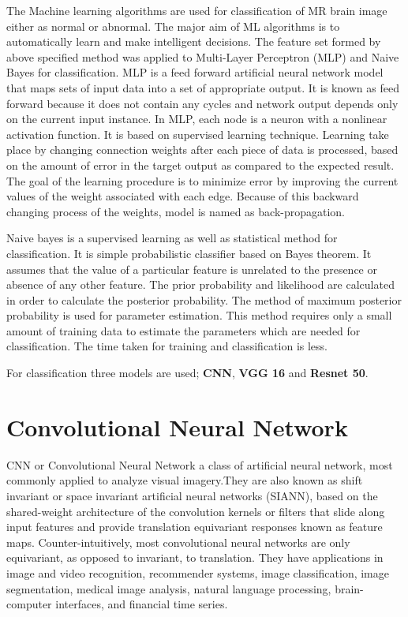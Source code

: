\documentclass[10pt]{report}
\begin{document}
	The Machine learning algorithms are used for
	classification of MR brain image either as normal or abnormal.  The major
	aim of ML algorithms is to automatically learn and make intelligent
	decisions. The feature set formed by above specified method was applied to
	Multi-Layer Perceptron (MLP) and Naive Bayes for classification.  MLP is
	a feed forward artificial neural network model that maps sets of input data
	into a set of appropriate output. It is known as feed forward because it
	does not contain any cycles and network output depends only on the current
	input instance. In MLP, each node is a neuron with a nonlinear activation
	function. It is based on supervised learning technique. Learning take place
	by changing connection weights after each piece of data is processed, based
	on the amount of error in the target output as compared to the expected
	result. The goal of the learning procedure is to minimize error by improving
	the current values of the weight associated with each edge. Because of this
	backward changing process of the weights, model is named as
	back-propagation.

	Naive bayes is a supervised learning as well as statistical method for
	classification. It is simple probabilistic classifier based on Bayes
	theorem. It assumes that the value of a particular feature is unrelated to
	the presence or absence of any other feature. The prior probability and
	likelihood are calculated in order to calculate the posterior probability.
	The method of maximum posterior probability is used for parameter
	estimation. This method requires only a small amount of training data to
	estimate the parameters which are needed for classification. The time taken
	for training and classification is less.

	For classification three models are used; \textbf{CNN}, \textbf{VGG 16} and
	\textbf{Resnet 50}.

	\section{Convolutional Neural Network}%

	CNN or Convolutional Neural Network a class of artificial neural network,
	most commonly applied to analyze visual imagery.They are also known as
	shift invariant or space invariant artificial neural networks (SIANN), based
	on the shared-weight architecture of the convolution kernels or filters that
	slide along input features and provide translation equivariant responses
	known as feature maps. Counter-intuitively, most convolutional neural
	networks are only equivariant, as opposed to invariant, to translation.
	They have applications in image and video recognition, recommender
	systems, image classification, image segmentation, medical image
	analysis, natural language processing, brain-computer interfaces, and
	financial time series.
\end{document}
